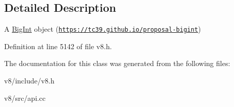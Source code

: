 \subsection{Detailed Description}
A \mbox{\hyperlink{classv8_1_1BigInt}{Big\+Int}} object (\href{https://tc39.github.io/proposal-bigint}{\tt https\+://tc39.\+github.\+io/proposal-\/bigint}) 

Definition at line 5142 of file v8.\+h.



The documentation for this class was generated from the following files\+:\begin{DoxyCompactItemize}
\item 
v8/include/v8.\+h\item 
v8/src/api.\+cc\end{DoxyCompactItemize}
